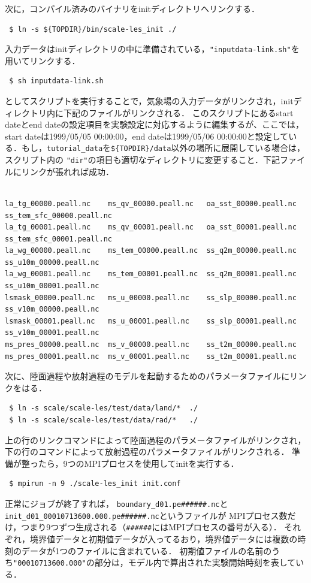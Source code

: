 次に，コンパイル済みのバイナリをinitディレクトリへリンクする．
\begin{verbatim}
 $ ln -s ${TOPDIR}/bin/scale-les_init ./
\end{verbatim}
入力データはinitディレクトリの中に準備されている，\verb|"inputdata-link.sh"|を用いてリンクする．
\begin{verbatim}
 $ sh inputdata-link.sh
\end{verbatim}
としてスクリプトを実行することで，気象場の入力データがリンクされ，initディレクトリ内に下記のファイルがリンクされる．
このスクリプトにあるstart dateとend dateの設定項目を実験設定に対応するように編集するが、ここでは，start dateは1999/05/05 00:00:00，end dateは1999/05/06 00:00:00と設定している．もし，\verb|tutorial_data|を\verb|${TOPDIR}/data|以外の場所に展開している場合は，スクリプト内の
\verb|"dir"|の項目も適切なディレクトリに変更すること．下記ファイルにリンクが張れれば成功．
{\small
\begin{verbatim}

la_tg_00000.peall.nc    ms_qv_00000.peall.nc   oa_sst_00000.peall.nc  ss_tem_sfc_00000.peall.nc
la_tg_00001.peall.nc    ms_qv_00001.peall.nc   oa_sst_00001.peall.nc  ss_tem_sfc_00001.peall.nc
la_wg_00000.peall.nc    ms_tem_00000.peall.nc  ss_q2m_00000.peall.nc  ss_u10m_00000.peall.nc
la_wg_00001.peall.nc    ms_tem_00001.peall.nc  ss_q2m_00001.peall.nc  ss_u10m_00001.peall.nc
lsmask_00000.peall.nc   ms_u_00000.peall.nc    ss_slp_00000.peall.nc  ss_v10m_00000.peall.nc
lsmask_00001.peall.nc   ms_u_00001.peall.nc    ss_slp_00001.peall.nc  ss_v10m_00001.peall.nc
ms_pres_00000.peall.nc  ms_v_00000.peall.nc    ss_t2m_00000.peall.nc
ms_pres_00001.peall.nc  ms_v_00001.peall.nc    ss_t2m_00001.peall.nc

\end{verbatim} }

次に、陸面過程や放射過程のモデルを起動するためのパラメータファイルにリンクをはる．
\begin{verbatim}
 $ ln -s scale/scale-les/test/data/land/*  ./
 $ ln -s scale/scale-les/test/data/rad/*   ./
\end{verbatim}
上の行のリンクコマンドによって陸面過程のパラメータファイルがリンクされ，
下の行のコマンドによって放射過程のパラメータファイルがリンクされる．
準備が整ったら，9つのMPIプロセスを使用してinitを実行する．
\begin{verbatim}
 $ mpirun -n 9 ./scale-les_init init.conf
\end{verbatim}

正常にジョブが終了すれば，
\verb|boundary_d01.pe######.nc|と\verb|init_d01_00010713600.000.pe######.nc|というファイルが
MPIプロセス数だけ，つまり9つずつ生成される（\verb|######|にはMPIプロセスの番号が入る）．
それぞれ，境界値データと初期値データが入ってるおり，境界値データには複数の時刻のデータが1つのファイルに含まれている．
初期値ファイルの名前のうち\verb|"00010713600.000"|の部分は，モデル内で算出された実験開始時刻を表している．

